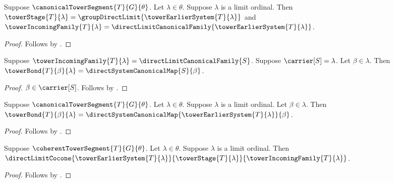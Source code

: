 \begin{proposition}\label{canonical_tower_segment_limit}
    Suppose $\canonicalTowerSegment{T}{G}{\theta}$.
    Let $\lambda\in\theta$.
    Suppose $\lambda$ is a limit ordinal.
    Then $\towerStage{T}{\lambda}=
            \groupDirectLimit{\towerEarlierSystem{T}{\lambda}}$ and
        $\towerIncomingFamily{T}{\lambda}=
            \directLimitCanonicalFamily{
                \towerEarlierSystem{T}{\lambda}}$.
\end{proposition}
\begin{proof}
    Follows by .
\end{proof}

\begin{proposition}\label{tower_limit_bond_from_incoming_family}
    Suppose $\towerIncomingFamily{T}{\lambda}=
        \directLimitCanonicalFamily{S}$.
    Suppose $\carrier[S]=\lambda$.
    Let $\beta\in\lambda$.
    Then $\towerBond{T}{\beta}{\lambda}=
        \directSystemCanonicalMap{S}{\beta}$.
\end{proposition}
\begin{proof}
    $\beta\in\carrier[S]$.
    Follows by
        .
\end{proof}

\begin{proposition}\label{canonical_tower_segment_limit_bond}
    Suppose $\canonicalTowerSegment{T}{G}{\theta}$.
    Let $\lambda\in\theta$.
    Suppose $\lambda$ is a limit ordinal.
    Let $\beta\in\lambda$.
    Then $\towerBond{T}{\beta}{\lambda}=
        \directSystemCanonicalMap{
            \towerEarlierSystem{T}{\lambda}}{\beta}$.
\end{proposition}
\begin{proof}
    Follows by
        .
\end{proof}

\begin{proposition}\label{coherent_tower_segment_limit}
    Suppose $\coherentTowerSegment{T}{G}{\theta}$.
    Let $\lambda\in\theta$.
    Suppose $\lambda$ is a limit ordinal.
    Then $\directLimitCocone
        {\towerEarlierSystem{T}{\lambda}}
        {\towerStage{T}{\lambda}}
        {\towerIncomingFamily{T}{\lambda}}$.
\end{proposition}
\begin{proof}
    Follows by .
\end{proof}

